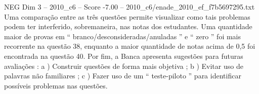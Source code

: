 \begin{textsample}{NEG Dim 3 – 2010\_c6 – Score -7.00 – 2010\_c6/enade\_2010\_ef\_f7b5697295.txt}
Uma comparação entre as três questões permite visualizar como tais problemas podem ter interferido, sobremaneira, nas notas dos estudantes.
Uma quantidade maior de provas em “ branco/desconsideradas/anuladas ” e “ zero ” foi mais recorrente na questão 38, enquanto a maior quantidade de notas acima de 0,5 foi encontrada na questão 40.
Por fim, a Banca apresenta sugestões para futuras avaliações : a ) Construir questões de forma mais objetiva ; b ) Evitar uso de palavras não familiares ; c ) Fazer uso de um “ teste-piloto ” para identificar possíveis problemas nas questões.

\end{textsample}
